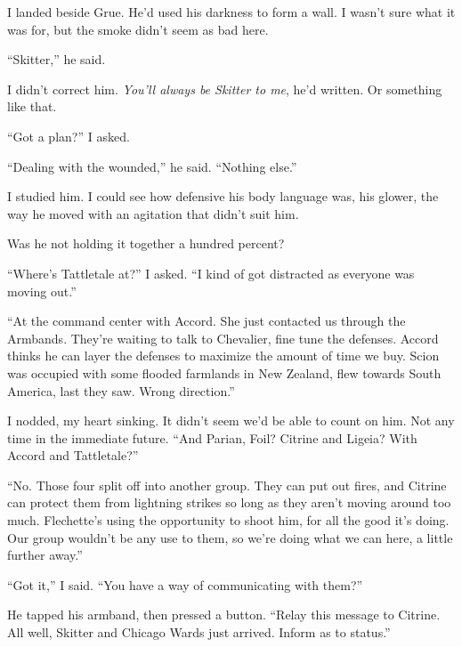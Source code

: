 I landed beside Grue.  He'd used his darkness to form a wall.  I wasn't sure what it was for, but the smoke didn't seem as bad here.



``Skitter,'' he said.



I didn't correct him.  \emph{You'll always be Skitter to me}, he'd written.  Or something like that.



``Got a plan?'' I asked.



``Dealing with the wounded,'' he said.  ``Nothing else.''



I studied him.  I could see how defensive his body language was, his glower, the way he moved with an agitation that didn't suit him.



Was he not holding it together a hundred percent?



``Where's Tattletale at?''  I asked.  ``I kind of got distracted as everyone was moving out.''



``At the command center with Accord.  She just contacted us through the Armbands.  They're waiting to talk to Chevalier, fine tune the defenses.  Accord thinks he can layer the defenses to maximize the amount of time we buy.  Scion was occupied with some flooded farmlands in New Zealand, flew towards South America, last they saw.  Wrong direction.''



I nodded, my heart sinking.  It didn't seem we'd be able to count on him.  Not any time in the immediate future.  ``And Parian, Foil?  Citrine and Ligeia?  With Accord and Tattletale?''



``No.  Those four split off into another group.  They can put out fires, and Citrine can protect them from lightning strikes so long as they aren't moving around too much.  Flechette's using the opportunity to shoot him, for all the good it's doing.  Our group wouldn't be any use to them, so we're doing what we can here, a little further away.''



``Got it,'' I said.  ``You have a way of communicating with them?''



He tapped his armband, then pressed a button.  ``Relay this message to Citrine.  All well, Skitter and Chicago Wards just arrived.  Inform as to status.''



